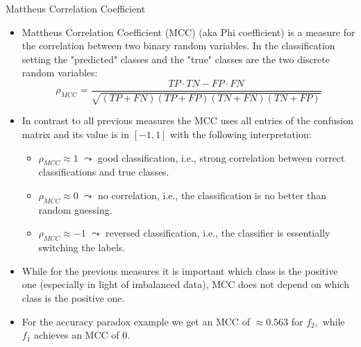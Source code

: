\documentclass[11pt,compress,t,notes=noshow, xcolor=table]{beamer}
\begin{document}
\begin{vbframe}{Mattheus Correlation Coefficient}
	\footnotesize{
	\begin{itemize}
		\item Mattheus Correlation Coefficient (MCC) (aka Phi coefficient) is a measure for the correlation between two binary random variables. In the classification setting the "predicted" classes and the "true" classes are the two discrete random variables:
%		
		$$   \rho_{MCC} = \frac{TP\cdot TN - FP \cdot FN}{\sqrt{(TP+FN)(TP+FP)(TN+FN)(TN+FP)}}$$
%		
		 \item In contrast to all previous measures the MCC uses all entries of the confusion matrix and its value is in $[-1,1]$ with the following interpretation:
%		 
		\begin{itemize}
			\footnotesize
			\item $\rho_{MCC} \approx 1$ $\leadsto$ good classification, i.e., strong correlation between correct classifications and true classes.
			\item $\rho_{MCC} \approx 0$ $\leadsto$ no correlation, i.e., the classification is no better than random guessing.
			\item $\rho_{MCC} \approx -1$ $\leadsto$ reversed classification, i.e., the classifier is essentially switching the labels.
		\end{itemize}
	 \item While for the previous measures it is important which class is the positive one (especially in light of imbalanced data), MCC does not depend on which class is the positive one.
%		
	\item For the accuracy paradox example we get an MCC of $\approx 0.563$ for $f_2,$ while $f_1$ achieves an MCC of 0. 
\end{itemize}
	}
\end{vbframe}
\end{document}
